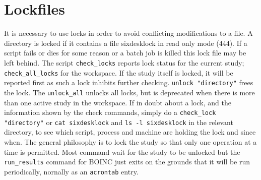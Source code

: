 \documentclass{cernatsnote}    %
\begin{document}
\section{Lockfiles}
It is necessary to use locks in order to
avoid conflicting modifications to a file. A directory is locked if
it contains a file sixdesklock in read only mode (444).
If a script fails or dies for some reason or a batch job
is killed this lock file may be left behind. The script
{\tt check\_locks} reports lock status for the current study;
{\tt check\_all\_locks} for the workspace. If the study itself is
locked, it will be reported first as such a lock inhibits further
checking. 
{\tt unlock "directory"} frees the lock. The {\tt unlock\_all} 
unlocks all locks, but is deprecated when there is more than
one active study in the workspace. If in doubt about a lock, 
and the information shown by the check commands, simply do a 
{\tt check\_lock "directory"} or {\tt cat sixdesklock} and
{\tt ls -l sixdesklock} in the 
relevant directory, to see which script, process and machine are 
holding the lock and since when. The general philosophy is to lock
the study so that only one operation at a time is permitted. Most
command wait for the study to be unlocked but the {\tt run\_results}
command for BOINC just exits on the grounds that it will be run periodically,
nornally as an {\tt acrontab} entry.
 
\end{document}
